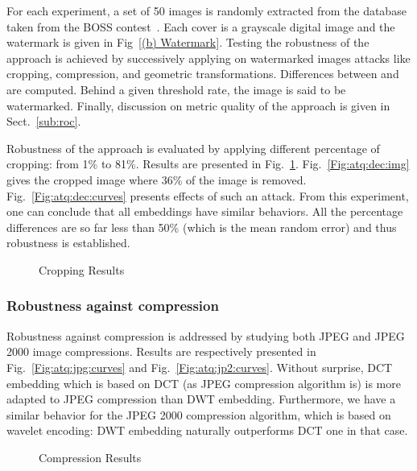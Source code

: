 \documentclass{comjnl}
\begin{document}
For each experiment, a set of 50 images is randomly extracted 
from the database taken from the BOSS contest~\cite{Boss10}. 
Each cover is a  grayscale digital image and the watermark  
is given in Fig~\ref{(b) Watermark}. 
Testing the robustness of the approach is achieved by successively applying
on watermarked images attacks like cropping, compression, and geometric 
transformations.
Differences between 
 and  are 
computed. Behind a given threshold rate, the image is said to be watermarked.  
Finally, discussion on metric quality of the approach is given in 
Sect.~\ref{sub:roc}.

 


Robustness of the approach is  evaluated by
applying different percentage of cropping: from 1\% to 81\%.
Results are presented in Fig.~\ref{Fig:atck:dec}. Fig.~\ref{Fig:atq:dec:img}
gives the cropped image 
where 36\% of the image is removed.
Fig.~\ref{Fig:atq:dec:curves} presents effects of such an attack.
From this experiment, one can conclude that all embeddings have similar 
behaviors.
All the percentage differences are so far less than 50\% 
(which is the mean random error) and thus robustness is established.



\begin{figure}[ht]
  \centering
{}\hspace{2cm}
\caption{Cropping Results}
\label{Fig:atck:dec}
\end{figure}


\subsubsection{Robustness against compression}

Robustness against compression is addressed
by studying both JPEG  and JPEG 2000 image compressions.
Results are respectively presented in Fig.~\ref{Fig:atq:jpg:curves}
and Fig.~\ref{Fig:atq:jp2:curves}.
Without surprise, DCT embedding which is based on DCT 
(as JPEG compression algorithm is) is  more 
adapted to JPEG compression than DWT embedding.
Furthermore, we have a similar behavior for the JPEG 2000 compression algorithm, which is based on wavelet encoding: DWT embedding naturally outperforms
DCT one in that case.  


\begin{figure}[ht]
  \centering
\caption{Compression Results}
\label{Fig:atck:comp}
\end{figure}
\end{document}
